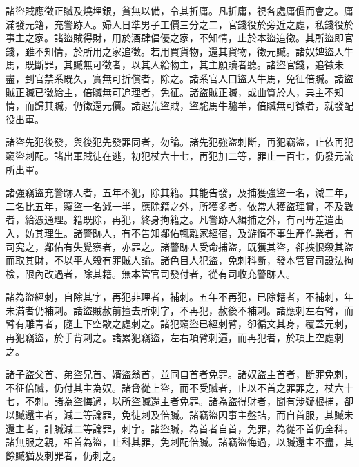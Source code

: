\begin{pinyinscope}
 諸盜賊應徵正贓及燒埋銀，貧無以備，令其折庸。凡折庸，視各處庸價而會之。庸滿發元籍，充警跡人。婦人日準男子工價三分之二，官錢役於旁近之處，私錢役於事主之家。諸盜賊得財，用於酒肆倡優之家，不知情，止於本盜追徵。其所盜即官錢，雖不知情，於所用之家追徵。若用買貨物，還其貨物，徵元贓。諸奴婢盜人牛馬，既斷罪，其贓無可徵者，以其人給物主，其主願贖者聽。諸盜官錢，追徵未盡，到官禁系既久，實無可折償者，除之。諸系官人口盜人牛馬，免征倍贓。諸盜賊正贓已徵給主，倍贓無可追理者，免征。諸盜賊正贓，或曲質於人，典主不知情，而歸其贓，仍徵還元價。諸遐荒盜賊，盜駝馬牛驢羊，倍贓無可徵者，就發配役出軍。



 諸盜先犯後發，與後犯先發罪同者，勿論。諸先犯強盜刺斷，再犯竊盜，止依再犯竊盜刺配。諸出軍賊徒在逃，初犯杖六十七，再犯加二等，罪止一百七，仍發元流所出軍。



 諸強竊盜充警跡人者，五年不犯，除其籍。其能告發，及捕獲強盜一名，減二年，二名比五年，竊盜一名減一半，應除籍之外，所獲多者，依常人獲盜理賞，不及數者，給憑通理。籍既除，再犯，終身拘籍之。凡警跡人緝捕之外，有司毋差遣出入，妨其理生。諸警跡人，有不告知鄰佑輒離家經宿，及游惰不事生產作業者，有司究之，鄰佑有失覺察者，亦罪之。諸警跡人受命捕盜，既獲其盜，卻挾恨殺其盜而取其財，不以平人殺有罪賊人論。諸色目人犯盜，免刺科斷，發本管官司設法拘檢，限內改過者，除其籍。無本管官司發付者，從有司收充警跡人。



 諸為盜經刺，自除其字，再犯非理者，補刺。五年不再犯，已除籍者，不補刺，年未滿者仍補刺。諸盜賊赦前擅去所刺字，不再犯，赦後不補刺。諸應刺左右臂，而臂有雕青者，隨上下空歇之處刺之。諸犯竊盜已經刺臂，卻徧文其身，覆蓋元刺，再犯竊盜，於手背刺之。諸累犯竊盜，左右項臂刺遍，而再犯者，於項上空處刺之。



 諸子盜父首、弟盜兄首、婿盜翁首，並同自首者免罪。諸奴盜主首者，斷罪免刺，不征倍贓，仍付其主為奴。諸脅從上盜，而不受贓者，止以不首之罪罪之，杖六十七，不刺。諸為盜悔過，以所盜贓還主者免罪。諸為盜得財者，聞有涉疑根捕，卻以贓還主者，減二等論罪，免徒刺及倍贓。諸竊盜因事主盤詰，而自首服，其贓未還主者，計贓減二等論罪，刺字。諸盜贓，為首者自首，免罪，為從不首仍全科。諸無服之親，相首為盜，止科其罪，免刺配倍贓。諸竊盜悔過，以贓還主不盡，其餘贓猶及刺罪者，仍刺之。



\end{pinyinscope}